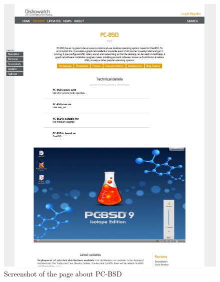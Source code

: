 \documentclass[thesis=B,english]{FITthesis}[2013/04/26]
\begin{document}
\begin{center}
\begin{figure}[overhang]
	\advance\leftskip-0.75cm
	\includegraphics[width=430pt]{images/screen_pcbsd.pdf}
	\caption{Screenshot of the page about PC-BSD}
	\label{fig: tndw-screens}
\end{figure}


\end{center}
\end{document}
